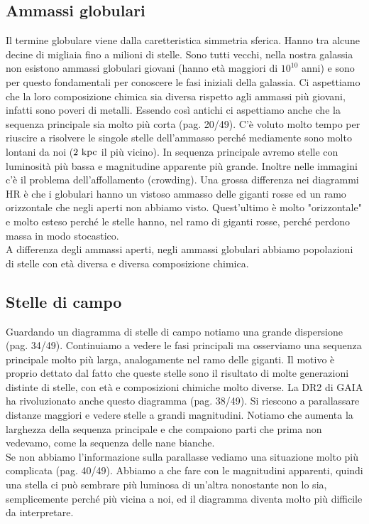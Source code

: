 \subsection*{Ammassi globulari}
Il termine globulare viene dalla caretteristica simmetria sferica. Hanno tra alcune decine di migliaia fino a milioni di stelle. Sono tutti vecchi, nella nostra galassia non esistono ammassi globulari giovani (hanno età maggiori di $10^{10}$ anni) e sono per questo fondamentali per conoscere le fasi iniziali della galassia. Ci aspettiamo che la loro composizione chimica sia diversa rispetto agli ammassi più giovani, infatti sono poveri di metalli. Essendo così antichi ci aspettiamo anche che la sequenza principale sia molto più corta (pag. 20/49). C'è voluto molto tempo per riuscire a risolvere le singole stelle dell'ammasso perché mediamente sono molto lontani da noi ($2\text{ kpc}$ il più vicino). In sequenza principale avremo stelle con luminosità più bassa e magnitudine apparente più grande. Inoltre nelle immagini c'è il problema dell'affollamento (crowding). Una grossa differenza nei diagrammi HR è che i globulari hanno un vistoso ammasso delle giganti rosse ed un ramo orizzontale che negli aperti non abbiamo visto. Quest'ultimo è molto "orizzontale" e molto esteso perché le stelle hanno, nel ramo di giganti rosse, perché perdono massa in modo stocastico. \\
A differenza degli ammassi aperti, negli ammassi globulari abbiamo popolazioni di stelle con età diversa e diversa composizione chimica.
\subsection*{Stelle di campo}
Guardando un diagramma di stelle di campo notiamo una grande dispersione (pag. 34/49). Continuiamo a vedere le fasi principali ma osserviamo una sequenza principale molto più larga, analogamente nel ramo delle giganti. Il motivo è proprio dettato dal fatto che queste stelle sono il risultato di molte generazioni distinte di stelle, con età e composizioni chimiche molto diverse. La DR2 di GAIA ha rivoluzionato anche questo diagramma (pag. 38/49). Si riescono a parallassare distanze maggiori e vedere stelle a grandi magnitudini. Notiamo che aumenta la larghezza della sequenza principale e che compaiono parti che prima non vedevamo, come la sequenza delle nane bianche.\\
Se non abbiamo l'informazione sulla parallasse vediamo una situazione molto più complicata (pag. 40/49). Abbiamo a che fare con le magnitudini apparenti, quindi una stella ci può sembrare più luminosa di un'altra nonostante non lo sia, semplicemente perché più vicina a noi, ed il diagramma diventa molto più difficile da interpretare. \\

